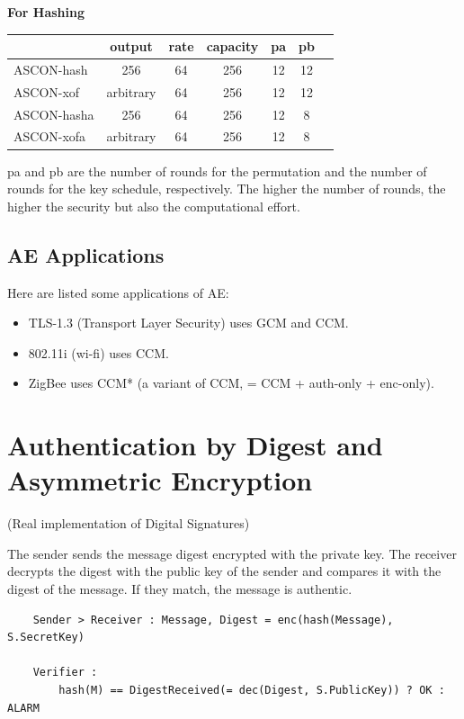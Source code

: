 \begin{center}
    \textbf{For Hashing}
\end{center}
\begin{table}[H]
    \centering
    \begin{tabular}{lcccccc}
        \toprule
        \textbf{} & \textbf{output} & \textbf{rate} & \textbf{capacity} & \textbf{pa} & \textbf{pb} \\
        \midrule
        ASCON-hash  & 256       & 64  & 256 & 12 & 12 \\
        ASCON-xof   & arbitrary & 64  & 256 & 12 & 12 \\
        ASCON-hasha & 256       & 64  & 256 & 12 & 8  \\
        ASCON-xofa  & arbitrary & 64  & 256 & 12 & 8  \\
        \bottomrule
    \end{tabular}
\end{table}
\begin{tcolorbox}[colback=blue!10!white, colframe=blue!50!white]
pa and pb are the number of rounds for the permutation and the number of rounds for the key schedule, respectively. The higher the number of rounds, the higher the security but also the computational effort.
\end{tcolorbox}

\subsection{AE Applications}
Here are listed some applications of AE:
\begin{itemize}
    \item TLS-1.3 (Transport Layer Security) uses GCM and CCM.
    \item 802.11i (wi-fi) uses CCM.
    \item ZigBee uses CCM* (a variant of CCM, = CCM + auth-only + enc-only).
\end{itemize}

\section{Authentication by Digest and Asymmetric Encryption}
\begin{center}
    (Real implementation of Digital Signatures)
\end{center}
The sender sends the message digest encrypted with the private key. The receiver decrypts the digest with the public key of the sender and compares it with the digest of the message. If they match, the message is authentic.
\begin{verbatim}
    Sender > Receiver : Message, Digest = enc(hash(Message), S.SecretKey)

    Verifier :
        hash(M) == DigestReceived(= dec(Digest, S.PublicKey)) ? OK : ALARM
\end{verbatim}

